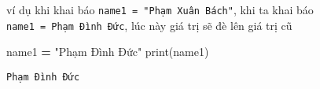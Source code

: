 \documentclass[
]{book}
\newenvironment{Shaded}{\begin{snugshade}}{\end{snugshade}}
\newcommand{\BuiltInTok}[1]{#1}
\newcommand{\NormalTok}[1]{#1}
\newcommand{\OperatorTok}[1]{\textcolor[rgb]{0.81,0.36,0.00}{\textbf{#1}}}
\newcommand{\StringTok}[1]{\textcolor[rgb]{0.31,0.60,0.02}{#1}}
\begin{document}
ví dụ khi khai báo \texttt{name1\ =\ "Phạm\ Xuân\ Bách"}, khi ta khai báo \texttt{name1\ =\ Phạm\ Đình\ Đức}, lúc này giá trị sẽ đè lên giá trị cũ

\begin{Shaded}
\begin{Highlighting}[]
\NormalTok{name1 }\OperatorTok{=} \StringTok{"Phạm Đình Đức"}
\BuiltInTok{print}\NormalTok{(name1)}
\end{Highlighting}
\end{Shaded}

\begin{verbatim}
Phạm Đình Đức
\end{verbatim}

\printindex
\end{document}
